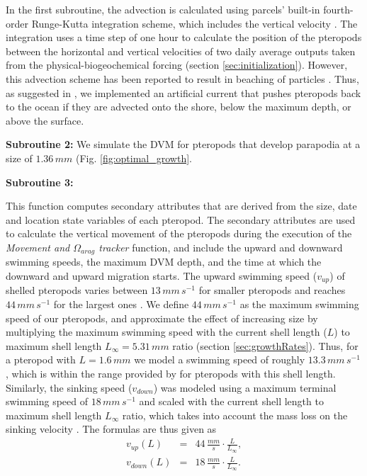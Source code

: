 In the first subroutine, the advection is calculated using parcels' built-in fourth-order Runge-Kutta integration scheme, which includes the vertical velocity \citep{Delandmeter2019Unbeaching}. The integration uses a time step of one hour to calculate the position of the pteropods between the horizontal and vertical velocities of two daily average outputs taken from the physical-biogeochemical forcing (section \ref{sec:initialization}). However, this advection scheme has been reported to result in beaching of particles \citep{Delandmeter2019Unbeaching}. Thus, as suggested in \cite{Delandmeter2019Unbeaching}, we implemented an artificial current that pushes pteropods back to the ocean if they are advected onto the shore, below the maximum depth, or above the surface.

\textbf{Subroutine 2:} We simulate the DVM for pteropods that develop parapodia at a size of $1.36 \, mm$ (Fig. \ref{fig:optimal_growth}.

\textbf{Subroutine 3:}






This function computes secondary attributes that are derived from the size, date and location state variables of each pteropod. The secondary attributes are used to calculate the vertical movement of the pteropods during the execution of the \textit{Movement and $\Omega_{arag}$ tracker} function, and include the upward and downward swimming speeds, the maximum DVM depth, and the time at which the downward and upward migration starts. 
The upward swimming speed ($v_{up}$) of shelled pteropods varies between $13 \, mm \, s^{-1}$ for smaller pteropods and reaches $44\, mm\, s^{-1}$ for the largest ones \citep{Chang2012SwimmingSpeedSize}. We define $44\, mm\, s^{-1}$ as the maximum swimming speed of our pteropods, and approximate the effect of increasing size by multiplying the maximum swimming speed with the current shell length ($L$) to maximum shell length $L_{\infty} = 5.31\, mm$ ratio (section \ref{sec:growthRates}).
Thus, for a pteropod with $L = 1.6\,mm$ we model a swimming speed of roughly $13.3 \, mm \, s^{-1}$, which is within the range provided by \cite{Murphy2016UpwardSwimming} for pteropods with this shell length. Similarly, the sinking speed ($v_{down}$) was modeled using a maximum terminal swimming speed of $18\, mm\, s^{-1}$ \citep{Bergan2017SwimmingSinkingSpeeds} and scaled with the current shell length to maximum shell length $L_{\infty}$ ratio, which takes into account the mass loss on the sinking velocity \citep{Byrne1984SettlingSpeed}. The formulas are thus given as
\begin{eqnarray}
v_{up}(L) & = & 44 \, \frac{mm}{s} \cdot \frac{L}{L_{\infty}},\\
v_{down}(L) & = & 18 \, \frac{mm}{s} \cdot \frac{L}{L_{\infty}}.
\end{eqnarray}


